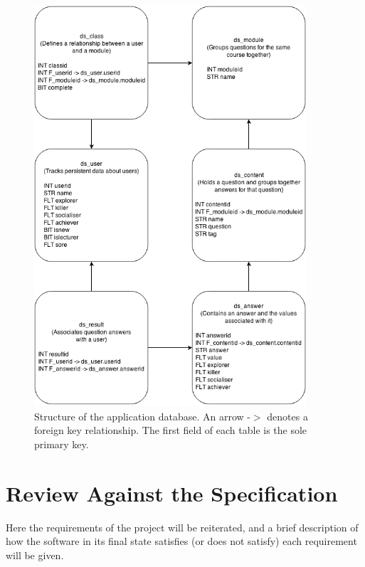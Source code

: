 \documentclass[12pt,a4paper,twoside]{report}
\begin{document}
\begin{figure}
	\begin{center}
		\includegraphics[width=0.9\textwidth]{../img/database.png}
		\caption{Structure of the application database. An arrow -$>$ denotes a foreign key relationship. The first field of each table is the sole primary key.}
		\label{database}
	\end{center}
\end{figure}

\section{Review Against the Specification}
Here the requirements of the project will be reiterated, and a brief description of how the software in its final state satisfies (or does not satisfy) each requirement will be given.
\end{document}
